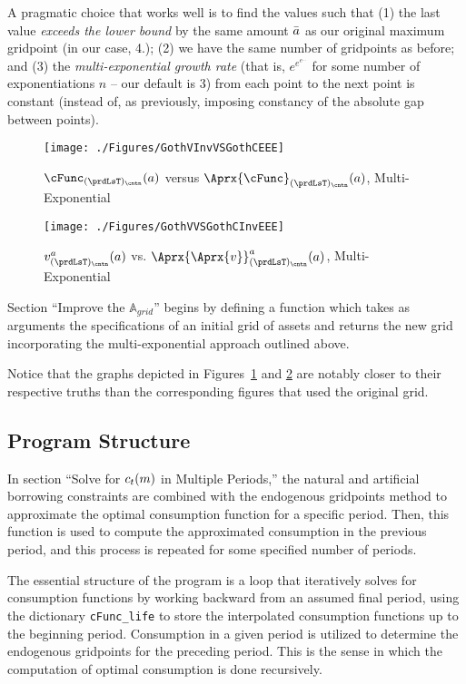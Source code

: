 \documentclass[SolvingMicroDSOPs]{subfiles}
\begin{document}
A pragmatic choice that works well is to find the values such that (1) the last value \textit{exceeds the lower bound} by the same amount $\bar{a}$ as our original maximum gridpoint (in our case, 4.); (2) we have the same number of gridpoints as before; and (3) the \textit{multi-exponential growth rate} (that is, $e^{e^{e^{...}}}$ for some number of exponentiations $n$ -- our default is 3) from each point to the next point is constant (instead of, as previously, imposing constancy of the absolute gap between points).

\hypertarget{GothVInvVSGothCEEE}{}
\begin{figure}
  \centerline{\texttt{[image: ./Figures/GothVInvVSGothCEEE]}}
  \caption{$\cFunc_{(\prdLsT)_\cntn}(\aNrm)$ versus
    $\Aprx{\cFunc}_{(\prdLsT)_\cntn}(\aNrm)$, Multi-Exponential }
  \label{fig:GothVInvVSGothCEE}
\end{figure}


\hypertarget{GothVVSGothCInvEEE}{}
\begin{figure}
  \texttt{[image: ./Figures/GothVVSGothCInvEEE]}
  \caption{$\vFunc^{a}_{(\prdLsT)_\cntn}(\aNrm)$ vs.
    $\Aprx{\Aprx{\vFunc}}_{(\prdLsT)_\cntn}^{a}(\aNrm)$, Multi-Exponential }
  \label{fig:GothVVSGothCInvEE}
\end{figure}

Section ``Improve the $\mathbb{A}_{grid}$'' begins by defining a function which takes as arguments the specifications of an initial grid of assets and returns the new grid incorporating the multi-exponential approach outlined above.


Notice that the graphs depicted in Figures~\ref{fig:GothVInvVSGothCEE} and \ref{fig:GothVVSGothCInvEE} are notably closer to their respective truths than the corresponding figures that used the original grid.

\subsection{Program Structure}

In section ``Solve for $c_t(m)$ in Multiple Periods,'' the natural and artificial borrowing constraints are combined with the endogenous gridpoints method to approximate the optimal consumption function for a specific period. Then, this function is used to compute the approximated consumption in the previous period, and this process is repeated for some specified number of periods.

The essential structure of the program is a loop that iteratively solves for consumption functions by working backward from an assumed final period, using the dictionary \texttt{cFunc\_life} to store the interpolated consumption functions up to the beginning period. Consumption in a given period is utilized to determine the endogenous gridpoints for the preceding period. This is the sense in which the computation of optimal consumption is done recursively.
\end{document}
